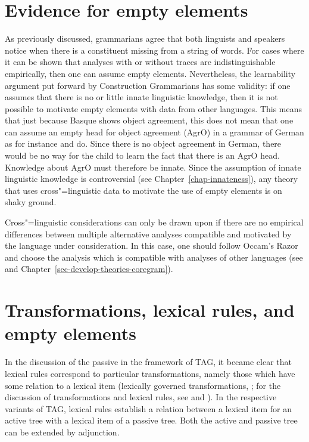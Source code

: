 \section{Evidence for empty elements}
\label{Abschnitt-Evidenz-leere-Elemente}

As previously discussed, grammarians agree that both linguists and speakers notice when there is a constituent missing from a
string of words. For cases where it can be shown that analyses with or without traces are indistinguishable empirically,
then one can assume empty elements. Nevertheless, the learnability argument put forward by
Construction Grammarians has some validity: if one assumes that there is no or little innate linguistic knowledge, then it is not possible to motivate empty elements
with data from other languages. This means that just because Basque shows object agreement,
this does not mean that one can assume an empty head for object agreement
(AgrO) in a grammar of German as
for instance \citet{Stechow96a} and \citet{Meinunger2000a} do. Since there is no object agreement in German, there
would be no way for the child to learn the fact that there is an AgrO head. Knowledge about AgrO
must therefore be innate. Since the assumption of innate linguistic knowledge is controversial (see
Chapter~\ref{chap-innateness}), any theory that uses cross"=linguistic data to motivate the use of empty elements is on shaky ground.

Cross"=linguistic considerations can only be drawn upon if there are no empirical differences between multiple alternative
analyses compatible and motivated by the language under consideration. In this case, one should follow Occam's Razor and choose the analysis which is compatible with analyses of
other languages (see \citealp{MuellerCoreGram} and Chapter~\ref{sec-develop-theories-coregram}).


\section{Transformations, lexical rules, and empty elements}
\label{Abschnitt-leere-Elemente-LRs-Transformations}

In the discussion of the passive in the framework of TAG, it became clear that lexical rules
correspond to particular transformations, namely those which have some relation to a lexical item (lexically governed transformations, \citealp{Dowty78a}; 
for the discussion of transformations and lexical rules, see  and ). In the respective variants of TAG\indextag, lexical rules establish a relation
between a lexical item for an active tree with a lexical item of a passive tree. Both the active and passive tree can be extended by adjunction.

